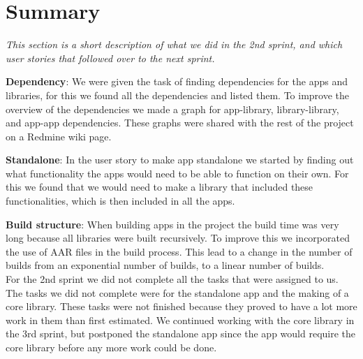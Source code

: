 \section{Summary} 
\textit{This section is a short description of what we did in the 2nd sprint, and which user stories that followed over to the next sprint.}

\textbf{Dependency}:
We were given the task of finding dependencies for the apps and libraries, for this we found all the dependencies and listed them. To improve the overview of the dependencies we made a graph for app-library, library-library, and app-app dependencies. These graphs were shared with the rest of the project on a Redmine wiki page.

\textbf{Standalone}:
In the user story to make app standalone we started by finding out what functionality the apps would need to be able to function on their own. For this we found that we would need to make a library that included these functionalities, which is then included in all the apps.

\textbf{Build structure}:
When building apps in the project the build time was very long because all libraries were built recursively. To improve this we incorporated the use of AAR files in the build process. This lead to a change in the number of builds from an exponential number of builds, to a linear number of builds.\\

For the 2nd sprint we did not complete all the tasks that were assigned to us. The tasks we did not complete were for the standalone app and the making of a core library. These tasks were not finished because they proved to have a lot more work in them than first estimated. We continued working with the core library in the 3rd sprint, but postponed the standalone app since the app would require the core library before any more work could be done.